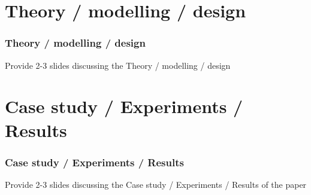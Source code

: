 \documentclass[presentation]{beamer}\mode<presentation>{\usetheme{blackAMSBolognaFC}}
\begin{document}
\section{Theory / modelling / design}

\begin{frame}%
\frametitle{Theory / modelling / design}

    Provide 2-3 slides discussing the Theory / modelling / design

\end{frame}

\section{Case study / Experiments / Results}

\begin{frame}%
\frametitle{Case study / Experiments / Results}

    Provide 2-3 slides discussing the Case study / Experiments / Results of the paper

\end{frame}
\end{document}

